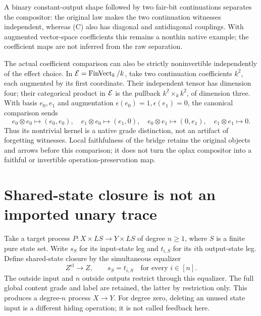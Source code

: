 \documentclass[11pt]{article}
\begin{document}
A binary constant-output shape followed by two fair-bit continuations separates the compositor: the original law makes the two continuation witnesses independent, whereas (C) also has diagonal and antidiagonal couplings. With augmented vector-space coefficients this remains a nonthin native example; the coefficient maps are not inferred from the raw separation.

The actual coefficient comparison can also be strictly noninvertible independently of the effect choice. In $\mathcal E=\operatorname{FinVect}_k/k$, take two continuation coefficients $k^2$, each augmented by its first coordinate. Their independent tensor has dimension four; their categorical product in $\mathcal E$ is the pullback $k^2\times_k k^2$, of dimension three. With basis $e_0,e_1$ and augmentation $\epsilon(e_0)=1,\epsilon(e_1)=0$, the canonical comparison sends
\[
 e_0\otimes e_0\mapsto(e_0,e_0),\quad
 e_1\otimes e_0\mapsto(e_1,0),\quad
 e_0\otimes e_1\mapsto(0,e_1),\quad
 e_1\otimes e_1\mapsto0.
\]
Thus its nontrivial kernel is a native grade distinction, not an artifact of forgetting witnesses. Local faithfulness of the bridge retains the original objects and arrows before this comparison; it does not turn the oplax compositor into a faithful or invertible operation-preservation map.

\section{Shared-state closure is not an imported unary trace}
Take a target process $P:X\times LS\to Y\times LS$ of degree $n\ge1$, where $S$ is a finite pure state set. Write $s_S$ for its input-state leg and $t_{i,S}$ for its $i$th output-state leg. Define shared-state closure by the simultaneous equalizer
\[
 Z^{\mathrm{cl}}\longrightarrow Z,
 \qquad s_S=t_{i,S}\quad\text{for every }i\in[n]. \tag{F}
\]
The outside input and $n$ outside outputs restrict through this equalizer. The full global content grade and label are retained, the latter by restriction only. This produces a degree-$n$ process $X\to Y$. For degree zero, deleting an unused state input is a different hiding operation; it is not called feedback here.
\end{document}
